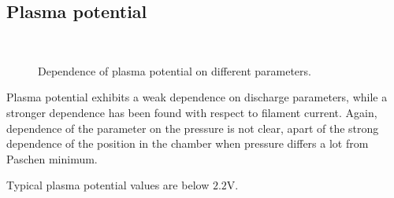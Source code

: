 \documentclass[11pt,a4 paper]{article}
\begin{document}
\subsection{Plasma potential}
\begin{figure}[H]
\\%
 \caption{Dependence of plasma potential on different parameters.}\label{fig:nnn}%
\end{figure}
Plasma potential exhibits a weak dependence on discharge parameters, while a stronger dependence has been found with respect to filament current. Again, dependence of the parameter on the pressure is not clear, apart of the strong dependence of the position in the chamber when pressure differs a lot from Paschen minimum.

Typical plasma potential values are below $2.2\si\volt$.
\end{document}
